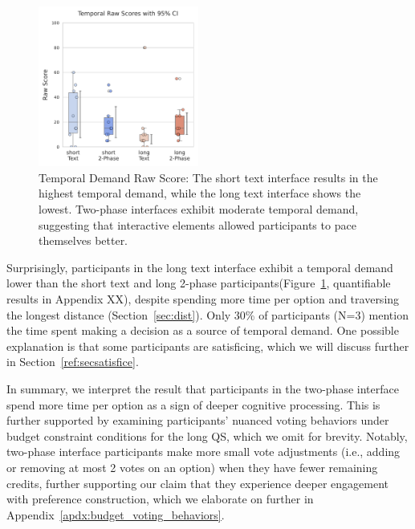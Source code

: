 \begin{figure}[h]
    \centering
    \includegraphics[width=0.47\textwidth, trim=0 13 0 13, clip]{content/image/cog/Temporal_scores.pdf}
    \captionsetup{width=0.47\textwidth, justification=justified}
    \caption{Temporal Demand Raw Score: The short text interface results in the highest temporal demand, while the long text interface shows the lowest. Two-phase interfaces exhibit moderate temporal demand, suggesting that interactive elements allowed participants to pace themselves better.}
    \label{fig:temporal_cog_score}
\end{figure}

Surprisingly, participants in the long text interface exhibit a temporal demand lower than the short text and long 2-phase participants(Figure~\ref{fig:temporal_cog_score}, quantifiable results in Appendix XX), despite spending more time per option and traversing the longest distance (Section~\ref{sec:dist}). Only 30\% of participants (N=3) mention the time spent making a decision as a source of temporal demand. One possible explanation is that some participants are satisficing, which we will discuss further in Section~\ref{ref:secsatisfice}.  

In summary, we interpret the result that participants in the two-phase interface spend more time per option as a sign of deeper cognitive processing. This is further supported by examining participants' nuanced voting behaviors under budget constraint conditions for the long QS, which we omit for brevity. Notably, two-phase interface participants make more small vote adjustments (i.e., adding or removing at most 2 votes on an option) when they have fewer remaining credits, further supporting our claim that they experience deeper engagement with preference construction, which we elaborate on further in Appendix~\ref{apdx:budget_voting_behaviors}.

